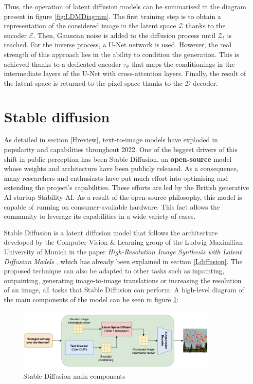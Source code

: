 Thus, the operation of latent diffusion models can be summarised in the diagram present in figure \ref{fig:LDMDiagram}. The first training step is to obtain a representation of the considered image in the latent space $\mathcal{Z}$ thanks to the encoder  $\mathcal{E}$. Then, Gaussian noise is added to the diffusion process until $\mathcal{Z}_t$ is reached. For the inverse process, a U-Net network is used. However, the real strength of this approach lies in the ability to condition the generation. This is achieved thanks to a dedicated encoder $\tau_\theta$ that maps the conditionings in the intermediate layers of the U-Net with cross-attention layers. Finally, the result of the latent space is returned to the pixel space thanks to the $\mathcal{D}$ decoder.

\section{Stable diffusion} \label{SD}

As detailed in section \ref{Hreview}, text-to-image models have exploded in popularity and capabilities throughout 2022. One of the biggest drivers of this shift in public perception has been Stable Diffusion, an \textbf{open-source} model whose weights and architecture have been publicly released. As a consequence, many researchers and enthusiasts have put much effort into optimising and extending the project's capabilities. These efforts are led by the British generative AI startup Stability AI. As a result of the open-source philosophy, this model is capable of running on consumer-available hardware. This fact allows the community to leverage its capabilities in a wide variety of cases.

Stable Diffusion is a latent diffusion model that follows the architecture developed by the Computer Vision \& Learning group of the Ludwig Maximilian University of Munich in the paper \textit{High-Resolution Image Synthesis with Latent Diffusion Models} \cite{rombach2022high}, which has already been explained in section \ref{Ldiffusion}. The proposed technique can also be adapted to other tasks such as inpainting, outpainting, generating image-to-image translations or increasing the resolution of an image, all tasks that Stable Diffusion can perform. A high-level diagram of the main components of the model can be seen in figure \ref{fig:SDdiagram}:

\begin{figure}
    \centering
    \includegraphics[width=0.9\textwidth]{Pictures/SDdiagram.png} 
    \caption{Stable Diffusion main components}
    \label{fig:SDdiagram}
\end{figure}

